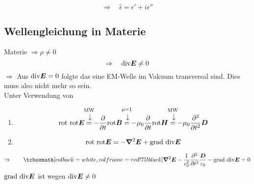 \begin{equation*}
\Rightarrow \quad \hat{\epsilon} = \epsilon' + i \epsilon''
\end{equation*}

\subsection{Wellengleichung in Materie}

Materie $ \Rightarrow \rho \neq 0 $
\begin{equation*}
\Rightarrow \quad \textrm{div} \bm{E} \neq 0
\end{equation*}
$ \Rightarrow $ Aus $ \textrm{div} \bm{E} = 0 $ folgte das eine EM-Welle im Vakuum transversal sind. Dies muss  also nicht mehr so sein.\\[5pt]
Unter Verwendung von
\begin{enumerate}[(1)]
	\item \begin{equation*}
	\tx{rot rot} \vec{E} \custoup{\rightarrow}{=}{\mathclap{\tx{MW}}} - \prt{}{t} \tx{rot} \vec{B} \custoup{\rightarrow}{=}{\mathclap{\mu = 1}} - \mu_0 \prt{}{t} \tx{rot} \vec{H} \custoup{\rightarrow}{=}{\mathclap{\tx{MW}}} - \mu_0 \prt{^2}{t^2} \vec{D}
	\end{equation*}
	\item \begin{equation*}
	\textrm{rot rot} \bm{E} = - \bm{\nabla}^2 \bm{E} + \textrm{grad div} \bm{E}
	\end{equation*}
\end{enumerate}
\begin{equation*}
\Rightarrow \qquad \rmbox{\vabla^2 \vec{E} - \frac{1}{c_0^2} \prt{^2}{t^2} \frac{\vec{D}}{\epsilon_0} - \tx{grad div} \vec{E} = 0}
\end{equation*}
\color{black!20!red} $ \textrm{grad div} \bm{E} $ ist wegen $ \textrm{div} \bm{E} \neq 0 $ \color{black}

